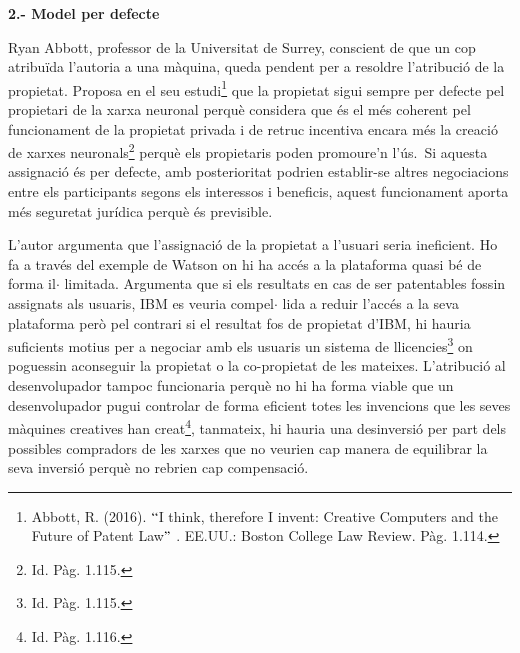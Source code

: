 \documentclass[12pt]{article}
\begin{document}
\vspace{\baselineskip}
\begin{justify}
\textbf{2.- Model per defecte}
\end{justify}\par


\vspace{\baselineskip}
\begin{justify}
Ryan Abbott, professor de la Universitat de Surrey, conscient de que un cop atribuïda l’autoria a una màquina, queda pendent per a resoldre l’atribució de la propietat. Proposa en el seu estudi\footnote{ Abbott, R. (2016). $``$I think, therefore I invent: Creative Computers and the Future of Patent Law$"$ . EE.UU.: Boston College Law Review. Pàg. 1.114. } que la propietat sigui sempre per defecte pel propietari de la xarxa neuronal perquè considera que és el més coherent pel funcionament de la propietat privada i de retruc incentiva encara més la creació de xarxes neuronals\footnote{ Id. Pàg. 1.115. } perquè els propietaris poden promoure’n l’ús.\  Si aquesta assignació és per defecte, amb posterioritat podrien establir-se altres negociacions entre els participants segons els interessos i beneficis, aquest funcionament aporta més seguretat jurídica perquè és previsible.
\end{justify}\par


\vspace{\baselineskip}
\begin{justify}
L’autor argumenta que l’assignació de la propietat a l’usuari seria ineficient. Ho fa a través del exemple de Watson on hi ha accés a la plataforma quasi bé de forma il$ \cdot $ limitada. Argumenta que si els resultats en cas de ser patentables fossin assignats als usuaris, IBM es veuria compel$ \cdot $ lida a reduir l’accés a la seva plataforma però pel contrari si el resultat fos de propietat d’IBM, hi hauria suficients motius per a negociar amb els usuaris un sistema de llicencies\footnote{ Id. Pàg. 1.115. } on poguessin aconseguir la propietat o la co-propietat de les mateixes. L’atribució al desenvolupador tampoc funcionaria perquè no hi ha forma viable que un desenvolupador pugui controlar de forma eficient totes les invencions que les seves màquines creatives han creat\footnote{ Id. Pàg. 1.116. }, tanmateix, hi hauria una desinversió per part dels possibles compradors de les xarxes que no veurien cap manera de equilibrar la seva inversió perquè no rebrien cap compensació. 
\end{justify}\par
\end{document}
